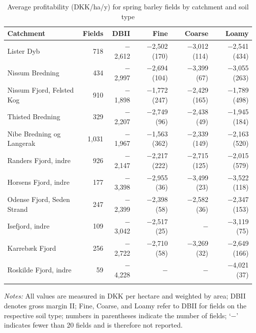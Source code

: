 \documentclass[12pt]{article}
\begin{document}
\begin{table}[H]
\centering
\small
\caption{Average profitability (DKK/ha/y) for spring barley fields by catchment and soil type}
\label{tab:dbii-vaarbyg}
\begin{threeparttable}
\begin{tabular}{lrrrrr}
\toprule
\textbf{Catchment} & \textbf{Fields} & \textbf{DBII} &
\textbf{Fine} & \textbf{Coarse} & \textbf{Loamy} \\
\midrule\addlinespace
Lister Dyb                 & 718 & $-$2,612 & $-$2,502 (170) & $-$3,012 (114) & $-$2,541 (434) \\
Nissum Bredning            & 434 & $-$2,997 & $-$2,694 (104) & $-$3,399 (67)  & $-$3,055 (263) \\
Nissum Fjord, Felsted Kog  & 910 & $-$1,898 & $-$1,772 (247) & $-$2,429 (165) & $-$1,789 (498) \\
Thisted Bredning           & 329 & $-$2,207 & $-$2,749 (96)  & $-$2,438 (49)  & $-$1,945 (184) \\
Nibe Bredning og Langerak  & 1,031 & $-$1,967 & $-$1,563 (362) & $-$2,339 (149) & $-$2,163 (520) \\
Randers Fjord, indre       & 926 & $-$2,147 & $-$2,217 (222) & $-$2,715 (125) & $-$2,015 (579) \\
Horsens Fjord, indre       & 177 & $-$3,398 & $-$2,955 (36)  & $-$3,499 (23)  & $-$3,522 (118) \\
Odense Fjord, Seden Strand & 247 & $-$2,399 & $-$2,398 (58)  & $-$2,582 (36)  & $-$2,347 (153) \\
Isefjord, indre            & 109 & $-$3,042 & $-$2,517 (25)  & $-$             & $-$3,119 (75) \\
Karrebæk Fjord             & 256 & $-$2,722 & $-$2,710 (58)  & $-$3,269 (32)  & $-$2,649 (166) \\
Roskilde Fjord, indre      & 59  & $-$4,228 & $-$             & $-$             & $-$4,021 (37) \\
\addlinespace\bottomrule
\end{tabular}
\begin{tablenotes}
\footnotesize
\item \textit{Notes:} All values are measured in DKK per hectare and weighted by area;
DBII denotes gross margin II; Fine, Coarse, and Loamy refer to DBII for fields on the
respective soil type; numbers in parentheses indicate the number of fields; `$-$' indicates fewer than 20 fields and is therefore not reported.
\end{tablenotes}
\end{threeparttable}
\end{table}
\end{document}
